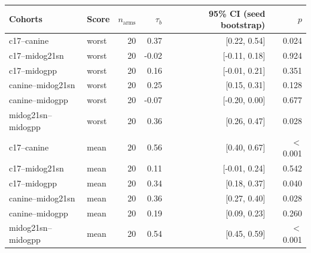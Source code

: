 \begin{tabular}{llrrrr}
\toprule
Cohorts & Score & $n_\text{arms}$ & $\tau_b$ & 95\% CI (seed bootstrap) & $p$ \\
\midrule
c17--canine & worst & 20 & 0.37 & [0.22, 0.54] & 0.024 \\
c17--midog21sn & worst & 20 & -0.02 & [-0.11, 0.18] & 0.924 \\
c17--midogpp & worst & 20 & 0.16 & [-0.01, 0.21] & 0.351 \\
canine--midog21sn & worst & 20 & 0.25 & [0.15, 0.31] & 0.128 \\
canine--midogpp & worst & 20 & -0.07 & [-0.20, 0.00] & 0.677 \\
midog21sn--midogpp & worst & 20 & 0.36 & [0.26, 0.47] & 0.028 \\
c17--canine & mean & 20 & 0.56 & [0.40, 0.67] & $<$0.001 \\
c17--midog21sn & mean & 20 & 0.11 & [-0.01, 0.24] & 0.542 \\
c17--midogpp & mean & 20 & 0.34 & [0.18, 0.37] & 0.040 \\
canine--midog21sn & mean & 20 & 0.36 & [0.27, 0.40] & 0.028 \\
canine--midogpp & mean & 20 & 0.19 & [0.09, 0.23] & 0.260 \\
midog21sn--midogpp & mean & 20 & 0.54 & [0.45, 0.59] & $<$0.001 \\
\bottomrule
\end{tabular}

